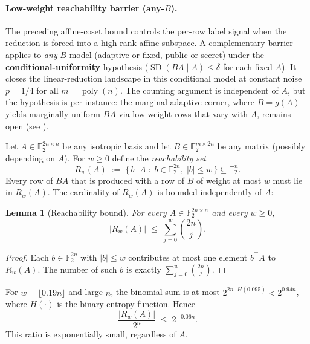 \documentclass[11pt,a4paper]{article}
\theoremstyle{plain}
\newtheorem{lemma}[theorem]{Lemma}
\theoremstyle{definition}
\newcommand{\F}{\mathbb{F}}
\begin{document}
\paragraph{Low-weight reachability barrier (any-$B$).}
The preceding affine-coset bound controls the per-row label signal when the reduction is forced into a high-rank affine subspace.  A complementary barrier applies to \emph{any} $B$ model (adaptive or fixed, public or secret) under the \textbf{conditional-uniformity} hypothesis ($\operatorname{SD}(BA\mid A)\le\delta$ for each fixed $A$).  It closes the linear-reduction landscape in this conditional model at constant noise $p=1/4$ for all $m=\operatorname{poly}(n)$.  The counting argument is independent of $A$, but the hypothesis is per-instance: the marginal-adaptive corner, where $B=g(A)$ yields marginally-uniform $BA$ via low-weight rows that vary with $A$, remains open (see ).

Let $A\in\F_2^{2n\times n}$ be any isotropic basis and let $B\in\F_2^{m\times 2n}$ be any matrix (possibly depending on $A$).  For $w\ge 0$ define the \emph{reachability set}
\[
R_w(A) \;:=\; \{\,b^{\!\top} A \;:\; b\in\F_2^{2n},\; |b|\le w \,\} \subseteq \F_2^{n}.
\]
Every row of $BA$ that is produced with a row of $B$ of weight at most $w$ must lie in $R_w(A)$.  The cardinality of $R_w(A)$ is bounded independently of $A$:

\begin{lemma}[Reachability bound]
\label{lem:reachability}
For every $A\in\F_2^{2n\times n}$ and every $w\ge 0$,
\[
|R_w(A)| \;\le\; \sum_{j=0}^{w} \binom{2n}{j}.
\]
\end{lemma}

\begin{proof}
Each $b\in\F_2^{2n}$ with $|b|\le w$ contributes at most one element $b^{\!\top}A$ to $R_w(A)$.  The number of such $b$ is exactly $\sum_{j=0}^{w}\binom{2n}{j}$.
\end{proof}

For $w=\lfloor 0.19n\rfloor$ and large $n$, the binomial sum is at most $2^{2n\cdot H(0.095)}<2^{0.94n}$, where $H(\cdot)$ is the binary entropy function.  Hence
\begin{equation}
\label{eq:reach-mass}
\frac{|R_w(A)|}{2^{n}} \;\le\; 2^{-0.06n}.
\end{equation}
This ratio is exponentially small, regardless of $A$.
\end{document}
